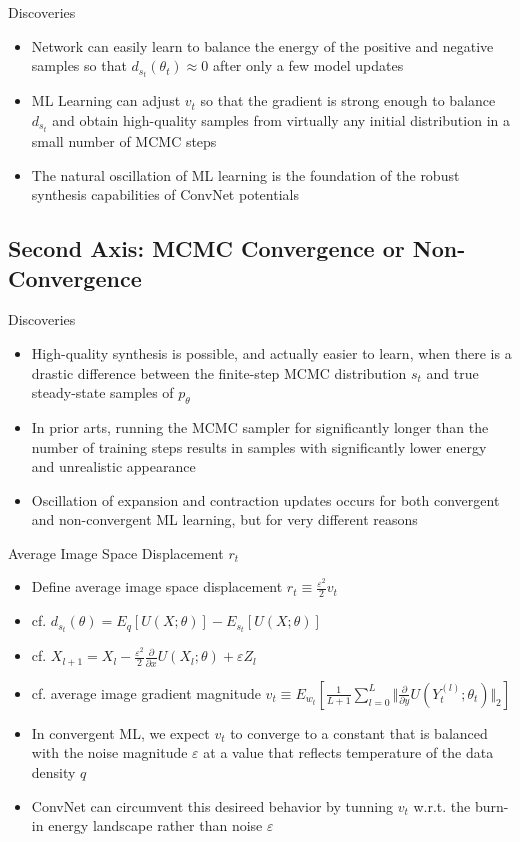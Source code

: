 \documentclass{beamer}
\begin{document}
\begin{frame}{Discoveries}
\begin{itemize}
\item Network can
easily learn to balance the energy of the positive and negative
samples so that $d_{s_t}(\theta_t)\approx 0$ after only a few model
updates
\item ML Learning can adjust $v_t$ so that the gradient is strong enough to balance $d_{s_t}$ and obtain high-quality
samples from virtually any initial distribution in a
small number of MCMC steps
\item The natural oscillation
of ML learning is the foundation of the robust synthesis
capabilities of ConvNet potentials
\end{itemize}
\end{frame}

\subsection{Second Axis: MCMC Convergence or Non-Convergence}
\begin{frame}{Discoveries}
\begin{itemize}
\item High-quality synthesis is possible, and actually easier to
learn, when there is a drastic difference between the finite-step
MCMC distribution $s_t$ and true steady-state samples of $p_\theta$
\item In prior arts, running the MCMC
sampler for significantly longer than the number of training
steps results in samples with significantly lower energy
and unrealistic appearance
\item Oscillation of expansion and contraction updates occurs
for both convergent and non-convergent ML learning, but
for very different reasons
\end{itemize}
\end{frame}

\begin{frame}{Average Image Space Displacement $r_t$}
\begin{itemize}
\item Define average image space displacement $r_t\equiv \frac{\varepsilon^2}{2}v_t$
\item cf. $d_{s_t}(\theta)=E_q[U(X;\theta)]-E_{s_t}[U(X;\theta)]$
\item cf. $X_{l+1}=X_l-\frac{\varepsilon^2}{2}\frac{\partial}{\partial x}U(X_l;\theta)+\varepsilon Z_l$
\item cf. average image gradient magnitude $v_t\equiv E_{w_t}[\frac{1}{L+1}\sum_{l=0}^L\Vert\frac{\partial}{\partial y}U(Y_t^{(l)};\theta_t)\Vert_2]$
\item In convergent ML, we expect $v_t$ to converge to a constant that is balanced with the noise magnitude $\varepsilon$ at a value that reflects temperature of the data density $q$
\item ConvNet can circumvent this desireed behavior by tunning $v_t$ w.r.t. the burn-in energy landscape rather than noise $\varepsilon$
\end{itemize}
\end{frame}
\end{document}
